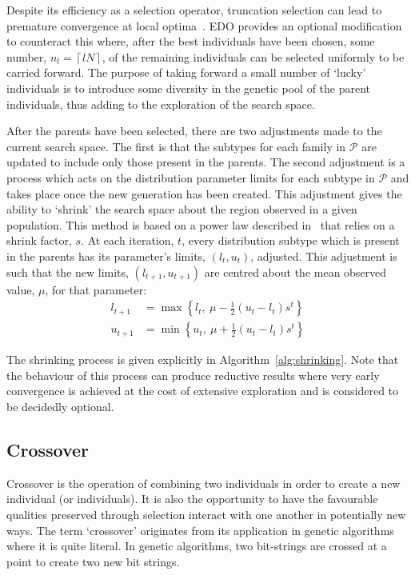 Despite its efficiency as a selection operator, truncation selection can lead to
premature convergence at local optima~\cite{Jebari2013,Motoki2002}. EDO provides
an optional modification to counteract this where, after the best individuals
have been chosen, some number, \(n_l = \left\lceil l N\right\rceil\), of the
remaining individuals can be selected uniformly to be carried forward. The
purpose of taking forward a small number of `lucky' individuals is to introduce
some diversity in the genetic pool of the parent individuals, thus adding to the
exploration of the search space.

After the parents have been selected, there are two adjustments made to the
current search space. The first is that the subtypes for each family in
\(\mathcal{P}\) are updated to include only those present in the parents. The
second adjustment is a process which acts on the distribution parameter limits
for each subtype in \(\mathcal{P}\) and takes place once the new generation has
been created. This adjustment gives the ability to `shrink' the search space
about the region observed in a given population. This method is based on a power
law described in~\cite{Amirjanov2016} that relies on a shrink factor, \(s\). At
each iteration, \(t\), every distribution subtype which is present in the
parents has its parameter's limits, \(\left(l_t, u_t\right)\), adjusted. This
adjustment is such that the new limits, \(\left(l_{t+1}, u_{t+1}\right)\) are
centred about the mean observed value, \(\mu\), for that parameter:
\begin{align}
    \label{eq:shrinking_lower}
    l_{t+1}&= \max \left\{l_t, \ \mu - \frac{1}{2} (u_t - l_t) s^t\right\}\\
    \label{eq:shrinking_upper}
    u_{t+1}&= \min \left\{u_t, \ \mu + \frac{1}{2} (u_t - l_t) s^t\right\}
\end{align}

The shrinking process is given explicitly in
Algorithm~\ref{alg:shrinking}. Note that the behaviour of this process can
produce reductive results where very early convergence is achieved at the cost
of extensive exploration and is considered to be decidedly optional.



\subsection{Crossover}

Crossover is the operation of combining two individuals in order to create a new
individual (or individuals). It is also the opportunity to have the favourable
qualities preserved through selection interact with one another in potentially
new ways. The term `crossover' originates from its application in genetic
algorithms where it is quite literal. In genetic algorithms, two bit-strings are
crossed at a point to create two new bit strings.

